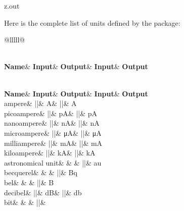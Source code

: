 \MyIO


\begin{VerbatimOut}{z.out}

Here is the complete list of units defined by the  package:

{
  \newcommand{\q}{\quad}
  \begin{longtable}{@{}lllll@{}}%
      \caption{Units}\\
      \textbf{Name}& \textbf{Input}& \textbf{Output}& \textbf{Input}& \textbf{Output}\\[6pt]
    \endfirsthead
      \caption[]{~\emph{continued}}\\
      \textbf{Name}& \textbf{Input}& \textbf{Output}& \textbf{Input}& \textbf{Output}\\[6pt]
    \endhead
    \endfoot
    \endlastfoot
    ampere&               |\A|&    \unit{\A}&    |\ampere|&             \unit{\ampere}\\
    \q picoampere&        |\pA|&   \unit{\pA}&   |\pico\ampere|&        \unit{\pico\ampere}\\
    \q nanoampere&        |\nA|&   \unit{\nA}&   |\nano\ampere|&        \unit{\nano\ampere}\\
    \q microampere&       |\uA|&   \unit{\uA}&   |\micro\ampere|&       \unit{\micro\ampere}\\
    \q milliampere&       |\mA|&   \unit{\mA}&   |\milli\ampere|&       \unit{\milli\ampere}\\
    \q kiloampere&        |\kA|&   \unit{\kA}&   |\kilo\ampere|&        \unit{\kilo\ampere}\\[6pt]
    astronomical unit&    &        &             |\astronomicalunit|&   \unit{\astronomicalunit}\\[6pt]
    becquerel&            &        &             |\becquerel|&          \unit{\becquerel}\\[6pt]
    bel&                  &        &             |\bel|&                \unit{\bel}\\
    \q decibel&           |\dB|&   \unit{\dB}&   |\decibel|&            \unit{\decibel}\\[6pt]
    bit&                  &        &             |\bit|&                \unit{\bit}\\[6pt]

\end{longtable}}
\end{VerbatimOut}
